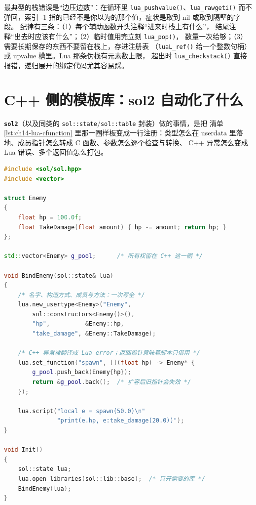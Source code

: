 \documentclass[12pt,a4paper,fontset=fandol]{ctexbook}
\newcommand{\Fn}[1]{\texttt{#1()}}
\newcommand{\Tp}[1]{\texttt{#1}}
\newcommand{\Bk}{\discretionary{}{}{}}
\newcommand{\Lib}[1]{\textbf{\texttt{#1}}}
\begin{document}
\begin{warning}[title={栈索引在循环里漂移}]
最典型的栈错误是``边压边数''：在循环里 \Fn{lua\_pushvalue}、\Fn{lua\_rawgeti}
而不弹回，索引 -1 指的已经不是你以为的那个值，症状是取到 nil 或取到隔壁的字段。
纪律有三条：（1）每个辅助函数开头注释``进来时栈上有什么''，
结尾注释``出去时应该有什么''；（2）临时值用完立刻 \Fn{lua\_pop}，
数量一次给够；（3）需要长期保存的东西不要留在栈上，存进注册表
（\Fn{luaL\_ref} 给一个整数句柄）或 upvalue 槽里。Lua 那条伪栈有元素数上限，
超出时 \Fn{lua\_checkstack} 直接报错，递归展开的绑定代码尤其容易踩。
\end{warning}

\section{C++ 侧的模板库：sol2 自动化了什么}
\label{sec:ch14-sol2}

\Lib{sol2}（以及同类的 \Tp{sol::state}/{\Bk}\Tp{sol::table} 封装）做的事情，是把
清单 \ref{lst:ch14-lua-cfunction} 里那一圈样板变成一行注册：类型怎么在
userdata 里落地、成员指针怎么转成 C 函数、参数怎么逐个检查与转换、
C++ 异常怎么变成 Lua 错误、多个返回值怎么打包。

\begin{lstlisting}[language=C++, style=cppstyle, caption={\Lib{sol2} 注册一个类型与一个工厂函数}, label={lst:ch14-sol2-bind}]
#include <sol/sol.hpp>
#include <vector>

struct Enemy
{
    float hp = 100.0f;
    float TakeDamage(float amount) { hp -= amount; return hp; }
};

std::vector<Enemy> g_pool;      /* 所有权留在 C++ 这一侧 */

void BindEnemy(sol::state& lua)
{
    /* 名字、构造方式、成员与方法：一次写全 */
    lua.new_usertype<Enemy>("Enemy",
        sol::constructors<Enemy()>(),
        "hp",          &Enemy::hp,
        "take_damage", &Enemy::TakeDamage);

    /* C++ 异常被翻译成 Lua error；返回指针意味着脚本只借用 */
    lua.set_function("spawn", [](float hp) -> Enemy* {
        g_pool.push_back(Enemy{hp});
        return &g_pool.back();  /* 扩容后旧指针会失效 */
    });

    lua.script("local e = spawn(50.0)\n"
               "print(e.hp, e:take_damage(20.0))");
}

void Init()
{
    sol::state lua;
    lua.open_libraries(sol::lib::base);  /* 只开需要的库 */
    BindEnemy(lua);
}
\end{lstlisting}
\end{document}
